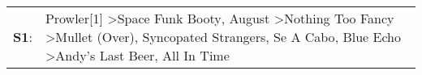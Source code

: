 \begin{supertabular}{p{0.03\textwidth}p{0.92\textwidth}}
 \textbf{S1}:  &  Prowler[1]\textsuperscript{} \textgreater \enspace Space Funk Booty\textsuperscript{}, \enspace August\textsuperscript{} \textgreater \enspace Nothing Too Fancy\textsuperscript{} \textgreater \enspace Mullet (Over)\textsuperscript{}, \enspace Syncopated Strangers\textsuperscript{}, \enspace Se A Cabo\textsuperscript{}, \enspace Blue Echo\textsuperscript{} \textgreater \enspace Andy's Last Beer\textsuperscript{}, \enspace All In Time\textsuperscript{}  \enspace  \\
\end{supertabular}
